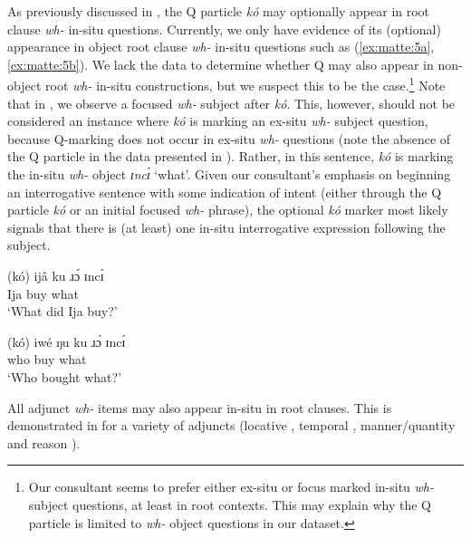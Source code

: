 \documentclass[output=paper,colorlinks,citecolor=brown
]{langscibook}
\begin{document}
As previously discussed in , the Q particle \textit{kó} may optionally appear in root clause \textit{wh-} in-situ questions. Currently, we only have evidence of its (optional) appearance in object root clause \textit{wh-} in-situ questions such as (\ref{ex:matte:5a}, \ref{ex:matte:5b}). We lack the data to determine whether Q may also appear in non-object root \textit{wh-} in-situ constructions, but we suspect this to be the case.\footnote{Our consultant seems to prefer either ex-situ or focus marked in-situ \textit{wh-} subject questions, at least in root contexts. This may explain why the Q particle is limited to \textit{wh-} object questions in our dataset.} Note that in , we observe a focused \textit{wh-} subject after \textit{kó}. This, however, should not be considered an instance where \textit{kó} is marking an ex-situ \textit{wh-} subject question, because Q-marking does not occur in ex-situ \textit{wh-} questions (note the absence of the Q particle in the data presented in ). Rather, in this sentence, \textit{kó} is marking the in-situ \textit{wh-} object \textit{ɪncɪ́} `what'. Given our consultant’s emphasis on beginning an interrogative sentence with some indication of intent (either through the Q particle \textit{kó} or an initial focused \textit{wh-} phrase), the optional \textit{kó} marker most likely signals that there is (at least) one in-situ interrogative expression following the subject.

\ea \label{ex:matte:5}
\begin{xlist}

\ex \label{ex:matte:5a}
\gll (kó) ijâ ku ɹɔ́ ɪncɪ́\\
\Q{} Ija \Pfv{} buy what\\
\glt `What did Ija buy?'

\ex \label{ex:matte:5b}
\gll (kó) iwé ŋu ku ɹɔ́ ɪncɪ́\\
\Q{} who \Foc{} \Pfv{} buy what\\
\glt `Who bought what?’
\end{xlist}
\z

\noindent All adjunct \textit{wh-} items may also appear in-situ in root clauses. This is demonstrated in  for a variety of adjuncts (locative , temporal , manner/quantity  and reason ).
\end{document}
